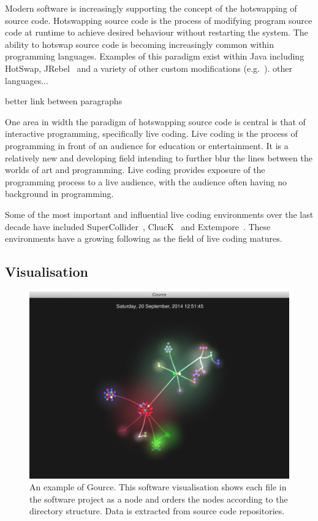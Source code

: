 Modern software is increasingly supporting the concept of the hotswapping of source code. Hotswapping source code is the process of modifying program source code at runtime to achieve desired behaviour without restarting the system. The ability to hotswap source code is becoming increasingly common within programming languages. Examples of this paradigm exist within Java including HotSwap, JRebel~\cite{ZeroTurnaround2014} and a variety of other custom modifications (e.g.~\cite{Thomas2011}). {\color{red} other languages...}

{\color{red} better link between paragraphs}

One area in width the paradigm of hotswapping source code is central is that of interactive programming, specifically live coding. Live coding is the process of programming in front of an audience for education or entertainment. It is a relatively new and developing field intending to further blur the lines between the worlds of art and programming. Live coding provides exposure of the programming process to a live audience, with the audience often having no background in programming.

Some of the most important and influential live coding environments over the last decade have included SuperCollider~\cite{McCartney}, ChucK~\cite{Wang2008} and Extempore~\cite{Sorensen}. These environments have a growing following as the field of live coding matures.


\subsection{Visualisation}

\begin{figure}
\centering
\includegraphics[width=1.0\textwidth]{../images/gource.png}
\caption{An example of Gource. This software visualisation shows each file in the software project as a node and orders the nodes according to the directory structure. Data is extracted from source code repositories.}
\label{fig:gource}
\end{figure}

